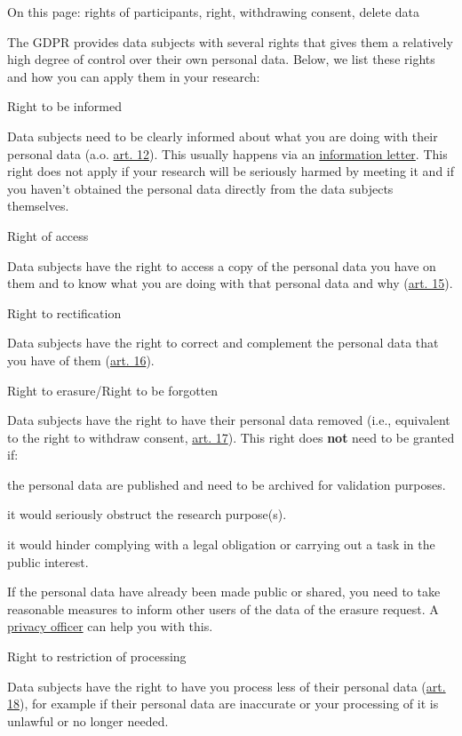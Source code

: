 \documentclass[
]{book}
\begin{document}
On this page: rights of participants, right, withdrawing consent, delete data

The GDPR provides data subjects with several rights that gives them a relatively
high degree of control over their own personal data. Below, we list these rights
and how you can apply them in your research:

Right to be informed

Data subjects need to be clearly informed about what you are doing with their
personal data (a.o. \href{https://gdpr-info.eu/art-12-gdpr/}{art. 12}).
This usually happens via an \protect\hyperlink{privacy-notices}{information letter}. This right
does not apply if your research will be seriously harmed by meeting it and if
you haven't obtained the personal data directly from the data subjects themselves.

Right of access

Data subjects have the right to access a copy of the personal data you have
on them and to know what you are doing with that personal data and why
(\href{https://gdpr-info.eu/art-15-gdpr/}{art. 15}).

Right to rectification

Data subjects have the right to correct and complement the personal data
that you have of them
(\href{https://gdpr-info.eu/art-16-gdpr/}{art. 16}).

Right to erasure/Right to be forgotten

Data subjects have the right to have their personal data removed (i.e.,
equivalent to the right to withdraw consent,
\href{https://gdpr-info.eu/art-17-gdpr/}{art. 17}).
This right does \textbf{not} need to be granted if:

the personal data are published and need to be archived for validation
purposes.

it would seriously obstruct the research purpose(s).

it would hinder complying with a legal obligation or carrying out a task
in the public interest.

If the personal data have already been made public or shared, you need to
take reasonable measures to inform other users of the data of the erasure
request. A \protect\hyperlink{support}{privacy officer} can help you with this.

Right to restriction of processing

Data subjects have the right to have you process less of their personal data
(\href{https://gdpr-info.eu/art-18-gdpr/}{art. 18}),
for example if their personal data are inaccurate or your processing of it
is unlawful or no longer needed.
\end{document}
